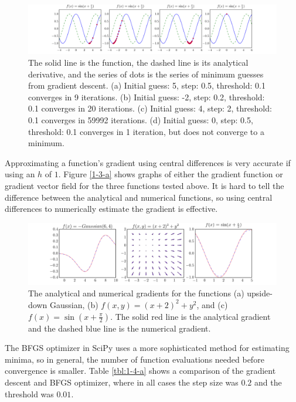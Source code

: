 \documentclass[10pt]{article}
\begin{document}
\begin{figure}[!ht]
	\centering
	\includegraphics[width=\textwidth]{exercise1-2-c.pdf}
	\caption{The solid line is the function, the dashed line is its analytical derivative, and the series of dots is the series of minimum guesses from gradient descent. (a) Initial guess: 5, step: 0.5, threshold: 0.1 converges in 9 iterations. (b) Initial guess: -2, step: 0.2, threshold: 0.1 converges in 20 iterations. (c) Initial guess: 4, step: 2, threshold: 0.1 converges in 59992 iterations. (d) Initial guess: 0, step: 0.5, threshold: 0.1 converges in 1 iteration, but does not converge to a minimum. }
	\label{fig:1-2-c}
\end{figure}

Approximating a function's gradient using central differences is very accurate if using an $h$ of $1$. Figure \ref{1-3-a} shows graphs of either the gradient function or gradient vector field for the three functions tested above. It is hard to tell the difference between the analytical and numerical functions, so using central differences to numerically estimate the gradient is effective.

\begin{figure}[!ht]
	\centering
	\includegraphics[width=\textwidth]{exercise1-3-a.pdf}
	\caption{The analytical and numerical gradients for the functions (a) upside-down Gaussian, (b) $f(x, y)= (x + 2)^2 + y^2$, and (c) $f(x) = \sin(x + \frac{\pi}{2})$. The solid red line is the analytical gradient and the dashed blue line is the numerical gradient.}
	\label{fig:1-3-a}
\end{figure}

The \textsc{BFGS} optimizer in SciPy uses a more sophisticated method for estimating minima, so in general, the number of function evaluations needed before convergence is smaller. Table \ref{tbl:1-4-a} shows a comparison of the gradient descent and \textsc{BFGS} optimizer, where in all cases the step size was $0.2$ and the threshold was $0.01$.
\end{document}
